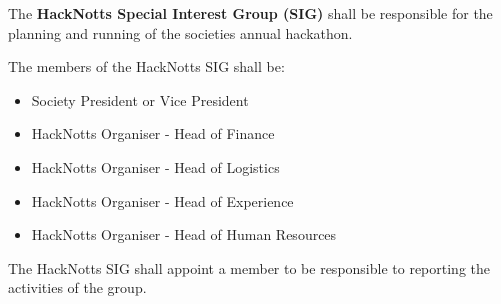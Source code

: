 \begin{clause}
    The \textbf{HackNotts Special Interest Group (SIG)} shall be responsible for the planning and running of the societies annual hackathon.
\end{clause}

\begin{subclause}
    The members of the HackNotts SIG shall be:
    \begin{itemize}[label=--,topsep=0em,itemsep=0em]
        \item Society President or Vice President
        \item HackNotts Organiser - Head of Finance
        \item HackNotts Organiser - Head of Logistics
        \item HackNotts Organiser - Head of Experience
        \item HackNotts Organiser - Head of Human Resources
    \end{itemize}
\end{subclause}

\begin{subclause}
    The HackNotts SIG shall appoint a member to be responsible to reporting the activities of the group.
\end{subclause}
